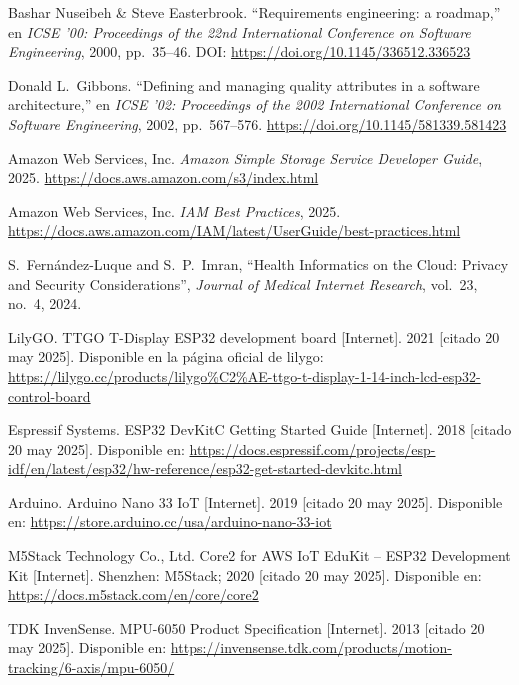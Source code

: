 \documentclass[12pt, a4paper]{article}
\begin{document}
\begin{thebibliography}{9}
	Bashar Nuseibeh \& Steve Easterbrook.  
	``Requirements engineering: a roadmap,''  
	en \textit{ICSE '00: Proceedings of the 22nd International Conference on Software Engineering}, 2000, pp.~35--46.  
	DOI: \url{https://doi.org/10.1145/336512.336523}
	
	Donald L.\ Gibbons.  
	``Defining and managing quality attributes in a software architecture,''  
	en \textit{ICSE '02: Proceedings of the 2002 International Conference on Software Engineering}, 2002, pp.~567--576.  
	\url{https://doi.org/10.1145/581339.581423}
	
	
	Amazon Web Services, Inc.
	\textit{Amazon Simple Storage Service Developer Guide}, 2025.
	\url{https://docs.aws.amazon.com/s3/index.html}
	
	Amazon Web Services, Inc.
	\textit{IAM Best Practices}, 2025.
	\url{https://docs.aws.amazon.com/IAM/latest/UserGuide/best-practices.html}
	
	S.~Fernández-Luque and S.~P.~Imran,
	“Health Informatics on the Cloud: Privacy and Security Considerations”,
	\textit{Journal of Medical Internet Research}, vol.~23, no.~4, 2024.


	
	LilyGO. TTGO T-Display ESP32 development board [Internet]. 2021 [citado 20 may 2025]. Disponible en la página oficial de lilygo: \url{https://lilygo.cc/products/lilygo%C2%AE-ttgo-t-display-1-14-inch-lcd-esp32-control-board}
	
	Espressif Systems. ESP32 DevKitC Getting Started Guide [Internet]. 2018 [citado 20 may 2025]. Disponible en: \url{https://docs.espressif.com/projects/esp-idf/en/latest/esp32/hw-reference/esp32-get-started-devkitc.html}
	

	
	Arduino. Arduino Nano 33 IoT [Internet]. 2019 [citado 20 may 2025]. Disponible en: \url{https://store.arduino.cc/usa/arduino-nano-33-iot}


	M5Stack Technology Co., Ltd. Core2 for AWS IoT EduKit – ESP32 Development Kit [Internet]. Shenzhen: M5Stack; 2020 [citado 20 may 2025]. Disponible en: \url{https://docs.m5stack.com/en/core/core2}

	
	TDK InvenSense. MPU-6050 Product Specification [Internet]. 2013 [citado 20 may 2025]. Disponible en: \url{https://invensense.tdk.com/products/motion-tracking/6-axis/mpu-6050/}
	

\end{thebibliography}
\end{document}
